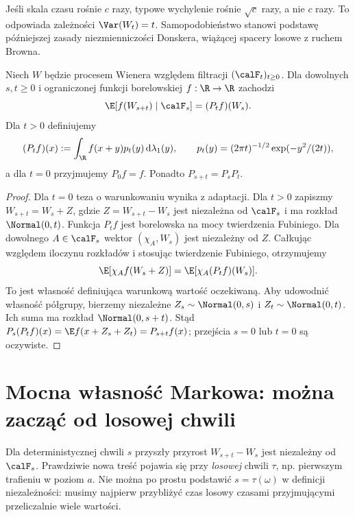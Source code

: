 \begin{uwaga}
Jeśli skala czasu rośnie $c$ razy, typowe wychylenie
rośnie $\sqrt c$ razy, a nie $c$ razy.
To odpowiada zależności $\Var(W_t)=t$.
Samopodobieństwo stanowi podstawę późniejszej zasady
niezmienniczości Donskera, wiążącej spacery losowe z
ruchem Browna.
\end{uwaga}

\begin{twierdzenie}
Niech $W$ będzie procesem Wienera względem filtracji
$(\calF_t)_{t\ge0}$. Dla dowolnych $s,t\ge0$
i ograniczonej funkcji borelowskiej $f:\R\to\R$ zachodzi
\[
\E[f(W_{s+t})\mid\calF_s]=(P_tf)(W_s).
\]
Dla $t>0$ definiujemy
\[
(P_tf)(x):=\int_\R f(x+y)p_t(y)\,\mathrm d\lambda_1(y),
\qquad p_t(y)=(2\pi t)^{-1/2}\exp(-y^2/(2t)),
\]
a dla $t=0$ przyjmujemy $P_0f=f$. Ponadto
$P_{s+t}=P_sP_t$.
\end{twierdzenie}
\begin{proof}
Dla $t=0$ teza o warunkowaniu wynika z adaptacji.
Dla $t>0$ zapiszmy $W_{s+t}=W_s+Z$, gdzie
$Z=W_{s+t}-W_s$ jest niezależna od $\calF_s$
i ma rozkład $\Normal(0,t)$. Funkcja $P_tf$
jest borelowska na mocy twierdzenia Fubiniego.
Dla dowolnego $A\in\calF_s$ wektor
$(\chi_A,W_s)$ jest niezależny od $Z$.
Całkując względem iloczynu rozkładów i stosując
twierdzenie Fubiniego, otrzymujemy
\[
\E[\chi_A f(W_s+Z)]=\E[\chi_A(P_tf)(W_s)].
\]
To jest własność definiująca warunkową wartość oczekiwaną.
Aby udowodnić własność półgrupy, bierzemy niezależne
$Z_s\sim\Normal(0,s)$ i $Z_t\sim\Normal(0,t)$.
Ich suma ma rozkład $\Normal(0,s+t)$. Stąd
$P_s(P_tf)(x)=\E f(x+Z_s+Z_t)=P_{s+t}f(x)$;
przejścia $s=0$ lub $t=0$ są oczywiste.
\end{proof}

\section{Mocna własność Markowa: można zacząć od losowej chwili}
Dla deterministycznej chwili $s$ przyszły przyrost
$W_{s+t}-W_s$ jest niezależny od $\calF_s$.
Prawdziwie nowa treść pojawia się przy \emph{losowej}
chwili $\tau$, np. pierwszym trafieniu w poziom $a$.
Nie można po prostu podstawić $s=\tau(\omega)$ w definicji
niezależności: musimy najpierw przybliżyć czas losowy
czasami przyjmującymi przeliczalnie wiele wartości.

